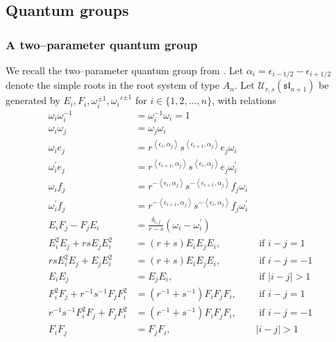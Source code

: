 \documentclass[12pt]{ximera}
\begin{document}
\subsection{Quantum groups}

\subsubsection{A two--parameter quantum group}

We recall the two--parameter quantum group from \cite{BW}. 
Let $\alpha_i = \epsilon_{i-1/2} - \epsilon_{i+1/2}$ denote the simple roots in the root system of type $A_{n}$.
Let $\mathcal{U}_{r,s}(\mathfrak{sl}_{n+1})$ be generated by $E_i,F_i,\omega_i^{\pm 1},\omega_i'^{\pm 1}$ for $i \in \{1,2,\ldots,n\}$, with relations
$$
\begin{aligned} \omega_{{i}} \omega_{{i}}^{-1} &=\omega_{{i}}^{-1} \omega_{{i}}=1 \\ 
\omega_{{i}} \omega_{{j}} &=\omega_{{j}} \omega_{{i}} \\
\omega_{i} e_{j}&=r^{\left\langle\epsilon_{i}, \alpha_{j}\right\rangle} s^{\left\langle\epsilon_{i+1}, \alpha_{j}\right\rangle} e_{j} \omega_{i}\\ 
 \omega_{i}^{\prime} e_{j}&=r^{\left\langle\epsilon_{i+1}, \alpha_{j}\right\rangle} s^{\left\langle\epsilon_{i}, \alpha_{j}\right\rangle} e_{j} \omega_{i}^{\prime}\\ 
\omega_{i} f_{j} &=r^{-\left\langle\epsilon_{i}, \alpha_{j}\right\rangle} s^{-\left\langle\epsilon_{i+1}, \alpha_{j}\right\rangle} f_{j} \omega_{i} \\ \omega_{i}^{\prime} f_{j} &=r^{-\left\langle\epsilon_{i+1}, \alpha_{j}\right\rangle} s^{-\left\langle\epsilon_{i}, \alpha_{j}\right\rangle} f_{j} \omega_{i}^{\prime} \\
 E_{{i}} F_{{j}}-F_{{j}} E_{{i}} &=\frac{\delta_{i, j}}{r-s}\left(\omega_{i}-\omega_{i}^{\prime}\right)\\
 E_{{i}}^{2} E_{{j}}+rsE_{{j}} E_{{i}}^{2} &=\left(r+s\right) E_{{i}} E_{{j}} E_{{i}}, & \text { if }i-j=1 \\ 
  rsE_{{i}}^{2} E_{{j}}+E_{{j}} E_{{i}}^{2} &=\left(r+s\right) E_{{i}} E_{{j}} E_{{i}}, & \text { if }i-j=-1 \\ 
 E_{{i}} E_{{j}} &=E_{{j}} E_{{i}}, & \text { if }|i-j|>1 \\ 
 F_{{i}}^{2} F_{{j}}+ r^{-1}s^{-1}F_{{j}} F_{{i}}^{2}&=\left(r^{-1}+s^{-1}\right) F_{{i}} F_{{j}} F_{{i}}, & \text { if }i-j=1 \\
  r^{-1}s^{-1}F_{{i}}^{2} F_{{j}}+ F_{{j}} F_{{i}}^{2}&=\left(r^{-1}+s^{-1}\right) F_{{i}} F_{{j}} F_{{i}}, & \text { if }i-j=-1 
 \\ F_{{i}} F_{{j}} &=F_{{j}} F_{{i}}, &|i-j|>1 \end{aligned}
$$ 
\end{document}
